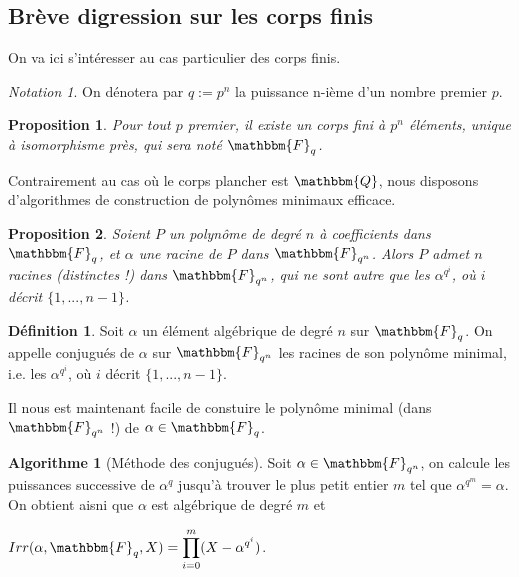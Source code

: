 \documentclass[12pt]{article}
\newcommand{\Q}{\mathbbm{Q}}
\newcommand{\Fq}{\mathbbm{F}_q}
\newcommand{\Fqn}{\mathbbm{F}_{q^n}}
\newtheorem{prop}{Proposition}
\theoremstyle{definition}\newtheorem{defn}{Définition}
\theoremstyle{definition}\newtheorem{exm}{Exemple}
\theoremstyle{definition}\newtheorem{rem}{Remarque}
\theoremstyle{definition}\newtheorem{algo}{Algorithme}
\theoremstyle{remark}\newtheorem{exo}{Exercice}
\theoremstyle{remark}\newtheorem{nota}{Notation}
\begin{document}
\subsection{Brève digression sur les corps finis}

On va ici s'intéresser au cas particulier des corps finis.

\begin{nota}
On dénotera par $q := p^n$ la puissance n-ième d'un nombre premier $p$.
\end{nota}

\begin{prop}
Pour tout $p$ premier, il existe un corps fini à $p^n$ éléments, unique à isomorphisme près, qui sera noté $\Fq$.
\end{prop}

Contrairement au cas où le corps plancher est $\Q$, nous disposons d'algorithmes de construction de polynômes minimaux efficace. 

\begin{prop}
Soient $P$ un polynôme de degré $n$ à coefficients dans $\Fq$, et $\alpha$ une racine de $P$ dans $\Fqn$. Alors $P$ admet $n$ racines (distinctes !) dans $\Fqn$, qui ne sont autre que les $\alpha^{q^i}$, où $i$ décrit $\{1, ..., n-1\}$.
\end{prop}

\begin{defn}
Soit $\alpha$ un élément algébrique de degré $n$ sur $\Fq$. On appelle conjugués de $\alpha$ sur $\Fqn$ les racines de son polynôme minimal, i.e. les $\alpha^{q^i}$, où $i$ décrit $\{1, ..., n-1\}$.
\end{defn}

Il nous est maintenant facile de constuire le polynôme minimal (dans $\Fqn$ !) de $\alpha \in \Fq$.

\begin{algo}[Méthode des conjugués]
Soit $\alpha \in \Fqn$, on calcule les puissances successive de $\alpha^{q}$ jusqu'à trouver le plus petit entier $m$ tel que $\alpha^{q^m} = \alpha$. On obtient aisni que $\alpha$ est algébrique de degré $m$ et 
\begin{center} $Irr(\alpha, \Fq, X) = \displaystyle \prod_{i=0}^m (X-\alpha^{q^i})$. \end{center}
\end{algo}



\pagebreak
\end{document}
